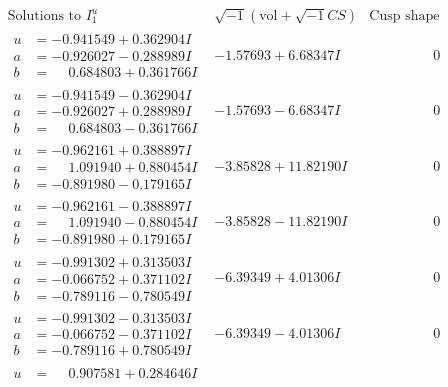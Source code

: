 \documentclass[1p]{elsarticle_modified}
\theoremstyle{definition}
\newcommand{\I}{\sqrt{-1}}
\begin{document}
$$\begin{array}{c|c|c}  
\text{Solutions to }I^u_{1}& \I (\text{vol} + \sqrt{-1}CS) & \text{Cusp shape}\\
 \hline 
\begin{aligned}
u &= -0.941549 + 0.362904 I \\
a &= -0.926027 - 0.288989 I \\
b &= \phantom{-}0.684803 + 0.361766 I\end{aligned}
 & -1.57693 + 6.68347 I & \phantom{-0.000000 } 0 \\ \hline\begin{aligned}
u &= -0.941549 - 0.362904 I \\
a &= -0.926027 + 0.288989 I \\
b &= \phantom{-}0.684803 - 0.361766 I\end{aligned}
 & -1.57693 - 6.68347 I & \phantom{-0.000000 } 0 \\ \hline\begin{aligned}
u &= -0.962161 + 0.388897 I \\
a &= \phantom{-}1.091940 + 0.880454 I \\
b &= -0.891980 - 0.179165 I\end{aligned}
 & -3.85828 + 11.82190 I & \phantom{-0.000000 } 0 \\ \hline\begin{aligned}
u &= -0.962161 - 0.388897 I \\
a &= \phantom{-}1.091940 - 0.880454 I \\
b &= -0.891980 + 0.179165 I\end{aligned}
 & -3.85828 - 11.82190 I & \phantom{-0.000000 } 0 \\ \hline\begin{aligned}
u &= -0.991302 + 0.313503 I \\
a &= -0.066752 + 0.371102 I \\
b &= -0.789116 - 0.780549 I\end{aligned}
 & -6.39349 + 4.01306 I & \phantom{-0.000000 } 0 \\ \hline\begin{aligned}
u &= -0.991302 - 0.313503 I \\
a &= -0.066752 - 0.371102 I \\
b &= -0.789116 + 0.780549 I\end{aligned}
 & -6.39349 - 4.01306 I & \phantom{-0.000000 } 0 \\ \hline\begin{aligned}
u &= \phantom{-}0.907581 + 0.284646 I \\

\end{aligned}
\end{array}$$
\end{document}
